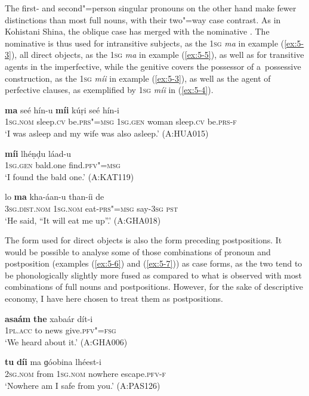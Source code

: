 The first- and second"=person singular pronouns on the other hand make fewer distinctions than most full nouns, with their two"=way case contrast. As in Kohistani Shina, the oblique case has merged with the nominative \citep[82]{schmidtkohistani2008}. The nominative is thus used for intransitive subjects, as the \textsc{1sg} \textit{ma} in example (\ref{ex:5-3}), all direct objects, as the \textsc{1sg} \textit{ma} in example (\ref{ex:5-5}), as well as for transitive agents in the imperfective, while the genitive covers the possessor of a~possessive construction, as the \textsc{1sg} \textit{míi} in example (\ref{ex:5-3}), as well as the agent of perfective clauses, as exemplified by \textsc{1sg} \textit{míi} in (\ref{ex:5-4}). 


\begin{exe}
\ex
\label{ex:5-3}
\gll \textbf{ma} seé hín-u \textbf{míi} kúṛi seé hín-i \\
	\textsc{1sg.nom} sleep.\textsc{cv} be.\textsc{prs"=msg} \textsc{1sg.gen} woman sleep.\textsc{cv} be.\textsc{prs-f} \\
\glt `I was asleep and my wife was also asleep.' (A:HUA015)

\ex
\label{ex:5-4}
\gll \textbf{míi} lhéṇḍu láad-u \\
	\textsc{1sg.gen} bald.one find.\textsc{pfv"=msg} \\
\glt `I found the bald one.' (A:KAT119)

\ex
\label{ex:5-5}
\gll lo \textbf{ma} kha-áan-u than-íi de \\
	\textsc{3sg.dist.nom} \textsc{1sg.nom} eat-\textsc{prs"=msg} say-\textsc{3sg} \textsc{pst} \\
\glt `He said, ``It will eat me up''.' (A:GHA018)
\end{exe}

The form used for direct objects is also the form preceding postpositions. It would be possible to analyse some of those combinations of pronoun and postposition (examples (\ref{ex:5-6}) and (\ref{ex:5-7})) as case forms, as the two tend to be phonologically slightly more fused as compared to what is observed with most combinations of full nouns and postpositions. However, for the sake of descriptive economy, I have here chosen to treat them as postpositions. 

\begin{exe}
\ex
\label{ex:5-6}
\gll \textbf{asaám} \textbf{the} xabaár dít-i \\
	1\textsc{pl}.\textsc{acc} to news give.\textsc{pfv"=fsg} \\
\glt `We heard about it.' (A:GHA006)

\ex
\label{ex:5-7}
\gll \textbf{tu} \textbf{díi} ma ɡóobina lhéest-i \\
\textsc{2sg.nom} from \textsc{1sg.nom} nowhere escape.\textsc{pfv-f} \\
\glt `Nowhere am I safe from you.' (A:PAS126)
\end{exe}

